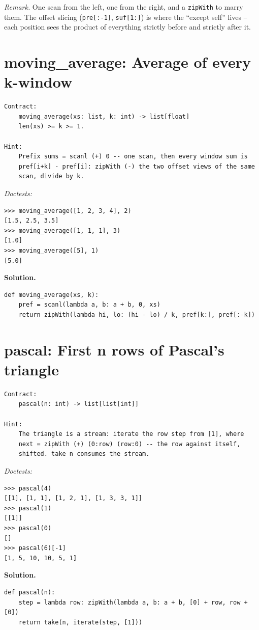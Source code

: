 \documentclass[11pt,letterpaper]{book}
\begin{document}
\noindent\textit{Remark.} One scan from the left, one from the right, and a
\texttt{zipWith} to marry them. The offset slicing (\texttt{pre[:-1]},
\texttt{suf[1:]}) is where the ``except self'' lives -- each position sees the
product of everything strictly before and strictly after it.

\section{moving\_average: Average of every k-window}
\begin{lstlisting}[style=spec]
Contract:
    moving_average(xs: list, k: int) -> list[float]
    len(xs) >= k >= 1.

Hint:
    Prefix sums = scanl (+) 0 -- one scan, then every window sum is
    pref[i+k] - pref[i]: zipWith (-) the two offset views of the same
    scan, divide by k.
\end{lstlisting}
\noindent\textit{Doctests:}
\begin{lstlisting}[style=spec]
>>> moving_average([1, 2, 3, 4], 2)
[1.5, 2.5, 3.5]
>>> moving_average([1, 1, 1], 3)
[1.0]
>>> moving_average([5], 1)
[5.0]
\end{lstlisting}
\noindent\textbf{Solution.}
\begin{lstlisting}[style=code]
def moving_average(xs, k):
    pref = scanl(lambda a, b: a + b, 0, xs)
    return zipWith(lambda hi, lo: (hi - lo) / k, pref[k:], pref[:-k])
\end{lstlisting}

\section{pascal: First n rows of Pascal's triangle}
\begin{lstlisting}[style=spec]
Contract:
    pascal(n: int) -> list[list[int]]

Hint:
    The triangle is a stream: iterate the row step from [1], where
    next = zipWith (+) (0:row) (row:0) -- the row against itself,
    shifted. take n consumes the stream.
\end{lstlisting}
\noindent\textit{Doctests:}
\begin{lstlisting}[style=spec]
>>> pascal(4)
[[1], [1, 1], [1, 2, 1], [1, 3, 3, 1]]
>>> pascal(1)
[[1]]
>>> pascal(0)
[]
>>> pascal(6)[-1]
[1, 5, 10, 10, 5, 1]
\end{lstlisting}
\noindent\textbf{Solution.}
\begin{lstlisting}[style=code]
def pascal(n):
    step = lambda row: zipWith(lambda a, b: a + b, [0] + row, row + [0])
    return take(n, iterate(step, [1]))
\end{lstlisting}
\end{document}
